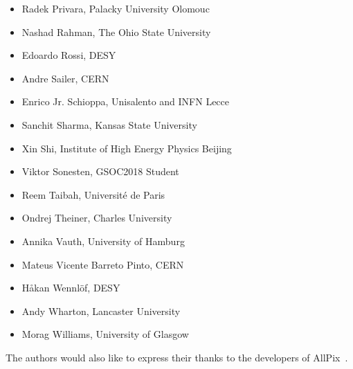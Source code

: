 \begin{itemize}
\item Radek Privara, Palacky University Olomouc
\item Nashad Rahman, The Ohio State University
\item Edoardo Rossi, DESY
\item Andre Sailer, CERN
\item Enrico Jr. Schioppa, Unisalento and INFN Lecce
\item Sanchit Sharma, Kansas State University
\item Xin Shi, Institute of High Energy Physics Beijing
\item Viktor Sonesten, GSOC2018 Student
\item Reem Taibah, Université de Paris
\item Ondrej Theiner, Charles University
\item Annika Vauth, University of Hamburg
\item Mateus Vicente Barreto Pinto, CERN
\item Håkan Wennlöf, DESY
\item Andy Wharton, Lancaster University
\item Morag Williams, University of Glasgow
\end{itemize}

The authors would also like to express their thanks to the developers of AllPix~\cite{ap1wiki,ap1git}.
